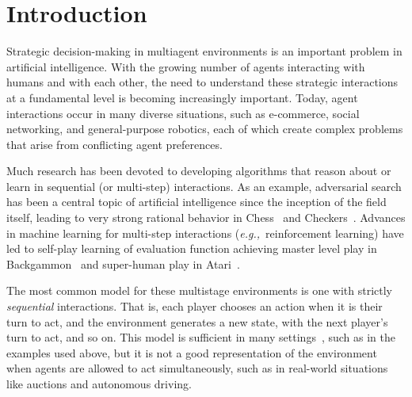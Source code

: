 \documentclass[preprint,12pt]{elsarticle}
\newcommand{\eg}{{\it e.g.,}~}
\begin{document}

\section{Introduction}
\label{sec:intro}

Strategic decision-making in multiagent environments is an important problem in artificial intelligence. 
With the growing number of agents interacting with humans and with each other, the need to 
understand these strategic interactions at a fundamental level is becoming increasingly important. 
Today, agent interactions occur in many diverse situations, such as e-commerce, social networking, and 
general-purpose robotics, each of which create complex problems that arise from conflicting agent 
preferences. 

Much research has been devoted to developing algorithms that reason about or learn in sequential (or multi-step) 
interactions. As an example, adversarial search has been a central topic of artificial intelligence 
since the inception of the field itself, leading to very strong rational behavior in 
Chess~\cite{Campbell02deepblue} and Checkers~\cite{Schaeffer96chinook}. Advances in machine learning for multi-step interactions 
(\eg reinforcement learning) have led to self-play learning of evaluation function achieving master level play 
in Backgammon~\cite{Tesauro95TDGammon} and super-human play in Atari~\cite{dqn2015}.

The most common model for these multistage environments is one with strictly {\it sequential} 
interactions. That is, each player chooses an action when it is their turn to act, and the environment 
generates a new state, with the next player's turn to act, and so on. This model is sufficient in many 
settings~\cite{AIbook}, such as in the examples used above, but it is not a good representation of the 
environment when agents are allowed to act simultaneously, such as in real-world situations like auctions and 
autonomous driving. 
\end{document}
